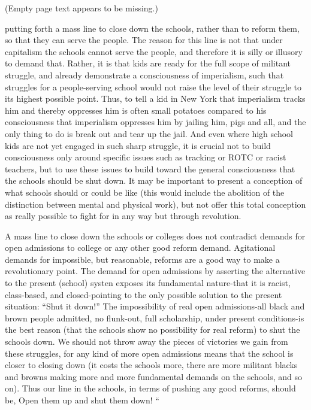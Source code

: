 \documentclass[12pt, titlepage]{article}
\begin{document}
{\begin{spacing}{1.10}
(Empty page text appears to be missing.)

putting forth a mass line to close down the schools, rather than to reform them, so that they can serve the people. The reason for this line is not that under capitalism the schools cannot serve the people, and therefore it is silly or illusory to demand that. Rather, it is that kids are ready for the full scope of militant struggle, and already demonstrate a consciousness of imperialism, such that struggles for a people-serving school would not raise the level of their struggle to its highest possible point. Thus, to tell a kid in New York that imperialism tracks him and thereby oppresses him is often small potatoes compared to his consciousness that imperialism oppresses him by jailing him, pigs and all, and the only thing to do is break out and tear up the jail. And even where high school kids are not yet engaged in such sharp struggle, it is crucial not to build consciousness only around specific issues such as tracking or ROTC or racist teachers, but to use these issues to build toward the general consciousness that the schools should be shut down. It may be important to present a conception of what schools should or could be like (this would include the abolition of the distinction between mental and physical work), but not offer this total conception as really possible to fight for in any way but through revolution.

A mass line to close down the schools or colleges does not contradict demands for open admissions to college or any other good reform demand. Agitational demands for impossible, but reasonable, reforms are a good way to make a revolutionary point. The demand for open admissions by asserting the alternative to the present (school) systen exposes its fundamental nature-that it is racist, class-based, and closed-pointing to the only possible solution to the present situation: ``Shut it down!'' The impossibility of real open admissions-all black and brown people admitted, no flunk-out, full scholarship, under present conditions-is the best reason (that the schools show no possibility for real reform) to shut the schools down. We should not throw away the pieces of victories we gain from these struggles, for any kind of more open admissions means that the school is closer to closing down (it costs the schools more, there are more militant blacks and browns making more and more fundamental demands on the schools, and so on). Thus our line in the schools, in terms of pushing any good reforms, should be, Open them up and shut them down! ``


\end{spacing}}
\end{document}
